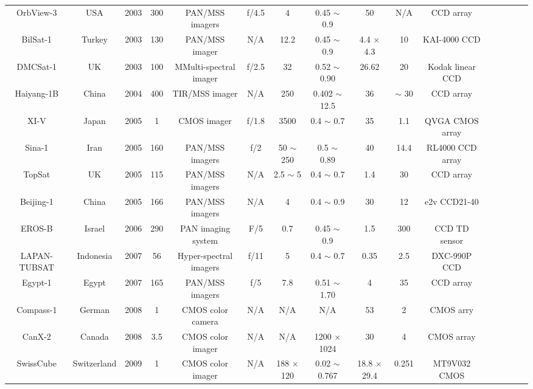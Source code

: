 \documentclass[final,5p,times,twocolumn]{elsarticle}
\begin{document}
\begin{table}
{\begin{tabular}{c c c c c c c c c c c c c c c c}
		    OrbView-3 & USA & 2003 & 300 & PAN/MSS imagers & f/4.5 & 4 & 0.45 $\sim$ 0.9 & 50 & N/A & CCD array & \citep{kramer2002observation}\\
		    BilSat-1 & Turkey & 2003 & 130 & PAN/MSS imager & N/A & 12.2 & 0.45 $\sim$ 0.9 &  4.4 $\times$ 4.3 & 10 &   KAI-4000 CCD & \citep{yuksel2005bilsat}\\
		    DMCSat-1 & UK & 2003 & 100 & MMulti-spectral imager &  f/2.5 & 32 & 0.52 $\sim$ 0.90 & 26.62 & 20 & Kodak linear CCD & \citep{eoportal}\\
		    Haiyang-1B & China & 2004 & 400 & TIR/MSS imager & N/A & 250 &  0.402 $\sim$ 12.5 & 36 & $\sim$ 30 & CCD array & \citep{eoportal}\\		
		    XI-V & Japan & 2005 & 1 & CMOS imager  & f/1.8 & 3500 & 0.4 $\sim$ 0.7 &  35 & 1.1 &  QVGA CMOS array & \citep{ FUNASE2007707}\\		     	
		    Sina-1 & Iran & 2005 & 160 & PAN/MSS imagers & f/2 & 50 $\sim$ 250 & 0.5 $\sim$ 0.89 &  40 &14.4 &  RL4000 CCD array & \cite{abolghasemi2012design}\\     
		    TopSat & UK & 2005 & 115 & PAN/MSS imagers & N/A & 2.5 $\sim$ 5 & 0.4 $\sim$ 0.7 &  1.4 & 30  & CCD array & \citep{price2002topsat}\\
		    Beijing-1 & China & 2005 & 166 & PAN/MSS imagers &   N/A & 4 & 0.4 $\sim$ 0.9 &  30 & 12 & e2v CCD21-40 & \citep{da2006small}\\ 
		    EROS-B & Israel & 2006 & 290 & PAN imaging system & F/5 & 0.7 & 0.45 $\sim$ 0.9 &  1.5 & 300 & CCD TD sensor & \citep{eoportal}\\		
		    LAPAN-TUBSAT & Indonesia & 2007 & 56 & Hyper-spectral imagers & f/11 & 5 & 0.4 $\sim$ 0.7 &  0.35 & 2.5 & DXC-990P CCD & \citep{hardhienata2007lapan} \\
		    Egypt-1 & Egypt & 2007 & 165 & PAN/MSS imagers & f/5 & 7.8 & 0.51 $\sim$ 1.70 & 4 & 35 &  CCD array & \citep{metwalli2012combining}\\
		    Compass-1 & German & 2008 & 1 & CMOS color camera & N/A & N/A & N/A & 53 & 2 &   CMOS arry & \citep{scholz2009flight}\\	
		    CanX-2 & Canada & 2008 & 3.5 & CMOS color imager & N/A & N/A & 1200 $\times$ 1024 & 30 & 4 & CMOS array & \citep{ rankin2005canx}\\		    	   
		    SwissCube & Switzerland & 2009 & 1 & CMOS color imager & N/A & 188 $\times$ 120 & 0.02 $\sim$ 0.767 & 18.8 $\times$ 29.4 & 0.251 &  MT9V032 CMOS & \citep{noca2009lessons}\\		

\end{tabular}}
\end{table}
\end{document}
